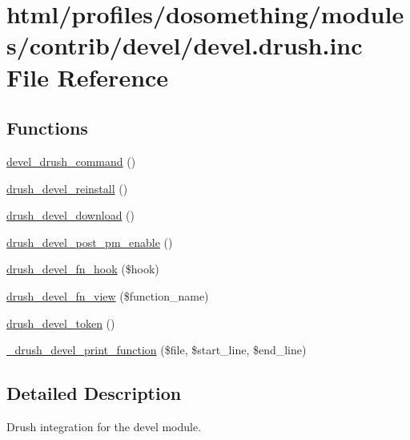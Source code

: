 \hypertarget{devel_8drush_8inc}{
\section{html/profiles/dosomething/modules/contrib/devel/devel.drush.inc File Reference}
\label{devel_8drush_8inc}
}
\subsection*{Functions}
\begin{DoxyCompactItemize}
\item 
\hyperlink{devel_8drush_8inc_ab08f7b328ff5bab75f129b89d692e33e}{devel\_\-drush\_\-command} ()
\item 
\hyperlink{devel_8drush_8inc_a86a559aeffa121938873c0aaa054290a}{drush\_\-devel\_\-reinstall} ()
\item 
\hyperlink{devel_8drush_8inc_acdf97b04dd6fc2c7acf9e69c6f99c833}{drush\_\-devel\_\-download} ()
\item 
\hyperlink{devel_8drush_8inc_a3266fbcda100b3e6d00f77813e0f26b8}{drush\_\-devel\_\-post\_\-pm\_\-enable} ()
\item 
\hyperlink{devel_8drush_8inc_a8e43e93a1b9979d8235af2458d1ba830}{drush\_\-devel\_\-fn\_\-hook} (\$hook)
\item 
\hyperlink{devel_8drush_8inc_aed8e15eae08ad844d59dce748251a251}{drush\_\-devel\_\-fn\_\-view} (\$function\_\-name)
\item 
\hyperlink{devel_8drush_8inc_ad8cf2a6701b49dac235bc6d721795e30}{drush\_\-devel\_\-token} ()
\item 
\hyperlink{devel_8drush_8inc_aace73474842484a9c0a90bf04752adc4}{\_\-drush\_\-devel\_\-print\_\-function} (\$file, \$start\_\-line, \$end\_\-line)
\end{DoxyCompactItemize}


\subsection{Detailed Description}
Drush integration for the devel module. 

